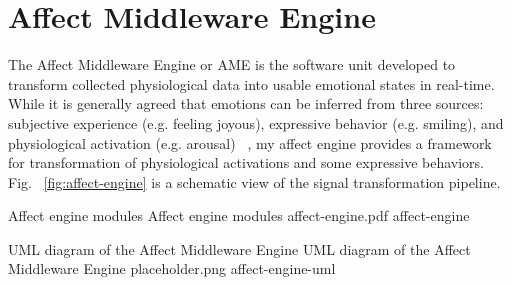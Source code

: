 
\section{Affect Middleware Engine}

The Affect Middleware Engine or AME is the software unit developed to transform collected physiological data into usable emotional states in real-time. While it is generally agreed that emotions can be inferred from three sources: subjective experience (e.g. feeling joyous), expressive behavior (e.g. smiling), and physiological activation (e.g. arousal) ~\cite{scherer1993neuroscience}, my affect engine provides a framework for transformation of physiological activations and some expressive behaviors. Fig. ~\ref{fig:affect-engine} is a schematic view of the signal transformation pipeline.

\img
{Affect engine modules}
{Affect engine modules}
{affect-engine.pdf}
{affect-engine}

\largeimg
{UML diagram of the Affect Middleware Engine}
{UML diagram of the Affect Middleware Engine}
{placeholder.png}
{affect-engine-uml}

